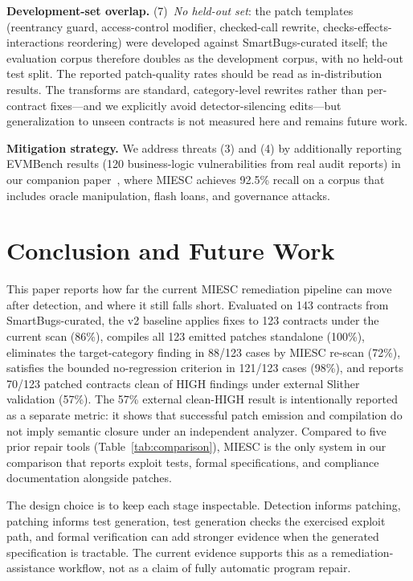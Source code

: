 \documentclass[conference]{IEEEtran}
\begin{document}
\textbf{Development-set overlap.} (7)~\emph{No held-out set}: the patch templates (reentrancy guard, access-control modifier, checked-call rewrite, checks-effects-interactions reordering) were developed against SmartBugs-curated itself; the evaluation corpus therefore doubles as the development corpus, with no held-out test split. The reported patch-quality rates should be read as in-distribution results. The transforms are standard, category-level rewrites rather than per-contract fixes---and we explicitly avoid detector-silencing edits---but generalization to unseen contracts is not measured here and remains future work.

\textbf{Mitigation strategy.} We address threats (3) and (4) by additionally reporting EVMBench results (120 business-logic vulnerabilities from real audit reports) in our companion paper~\cite{boiero2025miesc}, where MIESC achieves 92.5\% recall on a corpus that includes oracle manipulation, flash loans, and governance attacks.

\section{Conclusion and Future Work}

This paper reports how far the current MIESC remediation pipeline can move after detection, and where it still falls short. Evaluated on 143 contracts from SmartBugs-curated, the v2 baseline applies fixes to 123 contracts under the current scan (86\%), compiles all 123 emitted patches standalone (100\%), eliminates the target-category finding in 88/123 cases by MIESC re-scan (72\%), satisfies the bounded no-regression criterion in 121/123 cases (98\%), and reports 70/123 patched contracts clean of HIGH findings under external Slither validation (57\%). The 57\% external clean-HIGH result is intentionally reported as a separate metric: it shows that successful patch emission and compilation do not imply semantic closure under an independent analyzer. Compared to five prior repair tools (Table~\ref{tab:comparison}), MIESC is the only system in our comparison that reports exploit tests, formal specifications, and compliance documentation alongside patches.

The design choice is to keep each stage inspectable. Detection informs patching, patching informs test generation, test generation checks the exercised exploit path, and formal verification can add stronger evidence when the generated specification is tractable. The current evidence supports this as a remediation-assistance workflow, not as a claim of fully automatic program repair.
\end{document}
